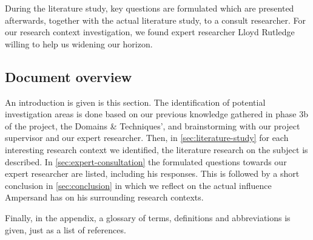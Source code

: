 During the literature study, key questions are formulated which are presented afterwards, together with the actual literature study, to a consult researcher.
For our research context investigation, we found expert researcher Lloyd Rutledge willing to help us widening our horizon.


\subsection{Document overview}
An introduction is given is this section.
The identification of potential investigation areas is done based on our previous knowledge gathered in phase 3b of the project, the Domains \& Techniques', and brainstorming with our project supervisor and our expert researcher.
Then, in \autoref{sec:literature-study} for each interesting research context we identified, the literature research on the subject is described.
In \autoref{sec:expert-consultation} the formulated questions towards our expert researcher are listed, including his responses.
This is followed by a short conclusion in \autoref{sec:conclusion} in which we reflect on the actual influence Ampersand has on his surrounding research contexts.

Finally, in the appendix, a glossary of terms, definitions and abbreviations is given, just as a list of references.
